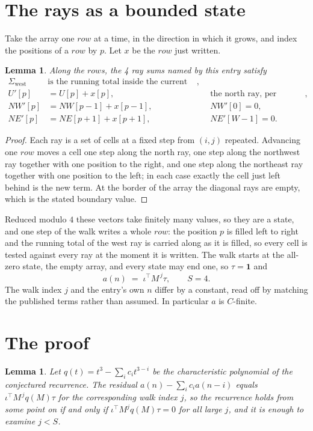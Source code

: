 \documentclass[11pt,a4paper]{article}
\theoremstyle{plain}
\newtheorem{lemma}[theorem]{Lemma}
\theoremstyle{definition}
\begin{document}
\section{The rays as a bounded state}

Take the array one $row$ at a time, in the direction in which it grows, and index the
positions of a $row $ by $p$. Let $x$ be the $row$ just written.

\begin{lemma}\label{lem:rays}
Along the $row$s, the 4 ray sums named by this entry satisfy
\[
\begin{aligned}
\Sigma_{\mathrm{west}}\ &\text{is the running total inside the current row},\\
U'[p]&=U[p]+x[p], &&\text{the north ray, per position},\\
NW'[p]&=NW[p-1]+x[p-1], && NW'[0]=0,\\
NE'[p]&=NE[p+1]+x[p+1], && NE'[W-1]=0 .
\end{aligned}
\]
\end{lemma}

\begin{proof}
Each ray is a set of cells at a fixed step from $(i,j)$ repeated. Advancing one $row$
moves a cell one step along the north ray, one step along the northwest ray together with one
position to the right, and one step along the northeast ray together with one position to the
left; in each case exactly the cell just left behind is the new term. At the border of the
array the diagonal rays are empty, which is the stated boundary value.
\end{proof}

Reduced modulo $4$ these vectors take finitely many values, so they are a state, and one step
of the walk writes a whole $row$: the position $p$ is filled left to right and the
running total of the west ray is carried along as it is filled, so every cell is tested
against every ray at the moment it is written. The walk starts at the all-zero state, the empty
array, and every state may end one, so $\tau=\mathbf{1}$ and
\[
a(n)\;=\;\iota^{\!\top}M^{\,j}\tau ,\qquad S=4.
\]
The walk index $j$ and the entry's own $n$ differ by a constant, read off by matching the
published terms rather than assumed. In particular $a$ is $C$-finite.

\section{The proof}

\begin{lemma}\label{lem:crit}
Let $q(t)=t^{3}-\sum_i c_it^{3-i}$ be the characteristic polynomial of the
conjectured recurrence. The residual $a(n)-\sum_ic_ia(n-i)$ equals
$\iota^{\!\top}M^{\,j}q(M)\tau$ for the corresponding walk index $j$, so the recurrence
holds from some point on if and only if $\iota^{\!\top}M^{j}q(M)\tau=0$ for all large $j$,
and it is enough to examine $j<S$.
\end{lemma}
\end{document}

